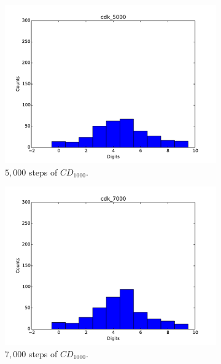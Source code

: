 \begin{figure}[hbt]
\begin{subfigure}[t]{0.18\textwidth}
  			\includegraphics[width=\textwidth]{pics_sdbn/gibbs_cdk_5000.pdf}
  		    \caption{$5,000$ steps of $CD_{1000}$.}
  		\end{subfigure}
  		\begin{subfigure}[t]{0.18\textwidth}
  			\includegraphics[width=\textwidth]{pics_sdbn/gibbs_cdk_7000.pdf}
  		    \caption{$7,000$ steps of $CD_{1000}$.}
  		\end{subfigure}
  		\begin{subfigure}[t]{0.18\textwidth}

\end{subfigure}
\end{figure}
